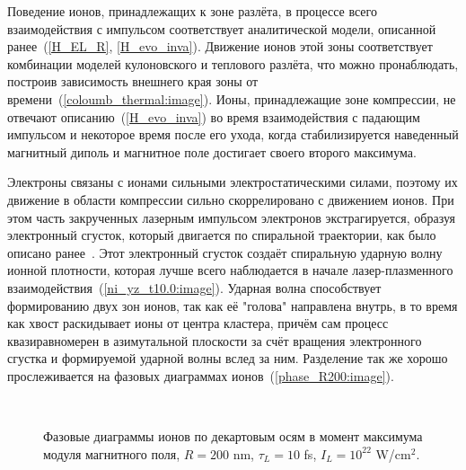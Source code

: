 Поведение ионов, принадлежащих к зоне разлёта, в процессе всего взаимодействия с импульсом соответствует аналитической модели, описанной ранее~(\ref{H_EL_R}, \ref{H_evo_inva}). Движение ионов этой зоны соответствует комбинации моделей кулоновского и теплового разлёта, что можно пронаблюдать, построив зависимость внешнего края зоны от времени~(\autoref{coloumb_thermal:image}). Ионы, принадлежащие зоне компрессии, не отвечают описанию~(\ref{H_evo_inva}) во время взаимодействия с падающим импульсом и некоторое время после его ухода, когда стабилизируется наведенный магнитный диполь и магнитное поле достигает своего второго максимума.

Электроны связаны с ионами сильными электростатическими силами, поэтому их движение в области компрессии сильно скоррелировано с движением ионов. При этом часть закрученных лазерным импульсом электронов экстрагируется, образуя электронный сгусток, который двигается по спиральной траектории, как было описано ранее~\cite{laura2015}. Этот электронный сгусток создаёт спиральную ударную волну ионной плотности, которая лучше всего наблюдается в начале лазер-плазменного взаимодействия~(\autoref{ni_yz_t10.0:image}). Ударная волна способствует формированию двух зон ионов, так как её "голова" направлена внутрь, в то время как хвост раскидывает ионы от центра кластера, причём сам процесс квазиравномерен в азимутальной плоскости за счёт вращения электронного сгустка и формируемой ударной волны вслед за ним. Разделение так же хорошо прослеживается на фазовых диаграммах ионов~(\autoref{phase_R200:image}).


    \begin{figure}[H]
        \hfil
        \\
        \caption{Фазовые диаграммы ионов по декартовым осям в момент максимума модуля магнитного поля, $R = 200$ nm, $\tau_L = 10$ fs, $I_L = 10^{22}$ W/cm$^{2}$.}\label{phase_R200:image}
    \end{figure}

